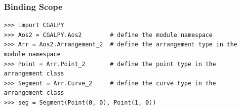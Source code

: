 \begin{frame}[fragile]
  \frametitle{Binding Scope}
  \tiny%
\begin{lstlisting}[style=pythonStyle]
>>> import CGALPY
>>> Aos2 = CGALPY.Aos2        # define the module namespace
>>> Arr = Aos2.Arrangement_2  # define the arrangement type in the module namespace
>>> Point = Arr.Point_2       # define the point type in the arrangement class
>>> Segment = Arr.Curve_2     # define the curve type in the arrangement class
>>> seg = Segment(Point(0, 0), Point(1, 0))
\end{lstlisting}
\end{frame}
